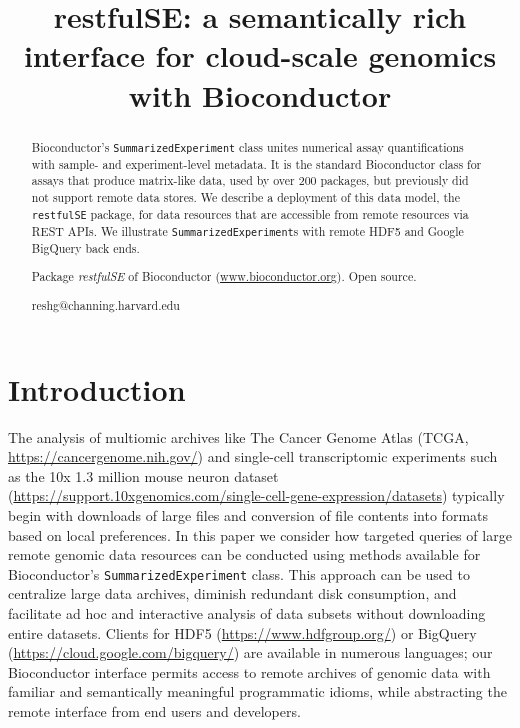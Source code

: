 \documentclass[applications]{gen-bioinformatics}
\author[1]{\pfnm{Shweta}
  \pinit{}
  \psnm{Gopaulakrishnan}}
\author[1]{\pfnm{Samuela}
  \pinit{}
  \psnm{Pollack}}
\author[1]{\pfnm{Benjamin}
  \pinit{}
  \psnm{Stubbs}}
\author[2]{\pfnm{Herv\'e}
  \pinit{}
  \psnm{Pag\`es}}
\author[3]{\pfnm{John}
  \pinit{}
  \psnm{Readey}}
\author[4]{\pfnm{Sean}
  \pinit{}
  \psnm{Davis}}
\author[5]{\pfnm{Levi}
  \pinit{}
  \psnm{Waldron}}
\author[6]{\pfnm{Martin}
  \pinit{T}
  \psnm{Morgan}}
\author[1]{\pfnm{Vincent}
  \pinit{J}
  \psnm{Carey}}
\newcommand{\Rpackage}[1]{{\textit{#1}}}
\begin{document}
\title{restfulSE: a semantically rich interface for cloud-scale genomics
with Bioconductor}
\maketitle

\begin{abstract}
\begin{subabstract}[Summary]
Bioconductor's \verb+SummarizedExperiment+ class unites numerical
assay quantifications with sample- and experiment-level metadata.  
It is the standard Bioconductor class for assays that
produce matrix-like data, used by over 200 packages, but
previously did not support remote data stores.
We describe a deployment of this data model, the 
\verb+restfulSE+ package, for data resources that are
accessible from remote resources via REST APIs.  We illustrate
\verb+SummarizedExperiment+s with remote HDF5 and Google
BigQuery back ends.
\end{subabstract}
\begin{subabstract}[Availability] Package \Rpackage{restfulSE} of Bioconductor
 (\url {www.bioconductor.org}). Open source.
\end{subabstract}
\begin{subabstract}[Contact]reshg@channing.harvard.edu
\end{subabstract}
\end{abstract}
\section*{Introduction}

The analysis of multiomic archives like The Cancer Genome Atlas (TCGA, \url{https://cancergenome.nih.gov/})
and single-cell transcriptomic experiments such as the 10x 1.3 million
mouse neuron dataset (\url{https://support.10xgenomics.com/single-cell-gene-expression/datasets}) typically begin with downloads of large files and
conversion of file contents into formats based on local preferences.
In this paper we consider how targeted queries of large remote genomic
data resources can be conducted using methods available for
Bioconductor's \verb+SummarizedExperiment+ class.  This approach can
be used to centralize large data archives, diminish redundant disk
consumption, and facilitate ad hoc and interactive analysis of data
subsets without downloading entire datasets. Clients for
HDF5 (\url{https://www.hdfgroup.org/}) or BigQuery (\url{https://cloud.google.com/bigquery/}) are available in numerous languages; our
Bioconductor interface permits access to remote archives of genomic
data with familiar and semantically meaningful programmatic idioms,
while abstracting the remote interface from end users
and developers.
\end{document}
